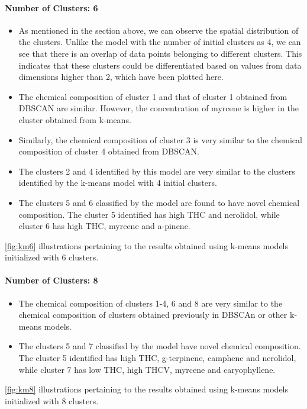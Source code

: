 \documentclass[11pt,a4paper]{article}
\begin{document}
\paragraph{Number of Clusters: 6}
\begin{itemize}
	\itemsep0em
	\item As mentioned in the section above, we can observe the spatial distribution of the clusters. Unlike the model with the number of initial clusters as 4, we can see that there is an overlap of data points belonging to different clusters. This indicates that these clusters could be differentiated based on values from data dimensions higher than 2, which have been plotted here.
	\item The chemical composition of cluster 1 and that of cluster 1 obtained from DBSCAN are similar. However, the concentration of myrcene is higher in the cluster obtained from k-means.
	\item Similarly, the chemical composition of cluster 3 is very similar to the chemical composition of cluster 4 obtained from DBSCAN.
	\item The clusters 2 and 4 identified by this model are very similar to the clusters identified by the k-means model with 4 initial clusters.
	\item The clusters 5 and 6 classified by the model are found to have novel chemical composition. The cluster 5 identified has high THC and nerolidol, while cluster 6 has high THC, myrcene and a-pinene.
\end{itemize}
\autoref{fig:km6} illustrations pertaining to the results obtained using k-means models initialized with 6 clusters.

\paragraph{Number of Clusters: 8}
\begin{itemize}
	\item The chemical composition of clusters 1-4, 6 and 8 are very similar to the chemical composition of clusters obtained previously in DBSCAn or other k-means models.
	\item The clusters 5 and 7 classified by the model have novel chemical composition. The cluster 5 identified has high THC, g-terpinene, camphene and nerolidol, while cluster 7 has low THC, high THCV, myrcene and caryophyllene.
\end{itemize}
\autoref{fig:km8} illustrations pertaining to the results obtained using k-means models initialized with 8 clusters.
\end{document}
